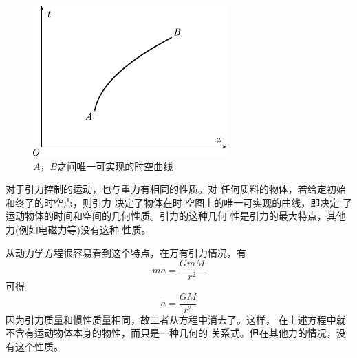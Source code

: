 \begin{figure}
	\centering
	\includegraphics{figure/fig04.08}
	\caption{$ A $，$ B $之间唯一可实现的时空曲线}
	\label{fig:04.08}
\end{figure}
对于引力控制的运动，也与重力有相同的性质。对
任何质料的物体，若给定初始和终了的时空点，则引力
决定了物体在时-空图上的唯一可实现的曲线，即决定
了运动物体的时间和空间的几何性质。引力的这种几何
性是引力的最大特点，其他力(例如电磁力等)没有这种
性质。

从动力学方程很容易看到这个特点，在万有引力情况，有
\begin{equation*}
	m a = \frac { G m M } { r ^ { 2 } }
\end{equation*}
可得\vspace{-1em}
\begin{equation*}
	a = \frac { G M } { r ^ { 2 } }
\end{equation*}
因为引力质量和惯性质量相同，故二者从方程中消去了。这样，
在上述方程中就不含有运动物体本身的物性，而只是一种几何的
关系式。但在其他力的情况，没有这个性质。
